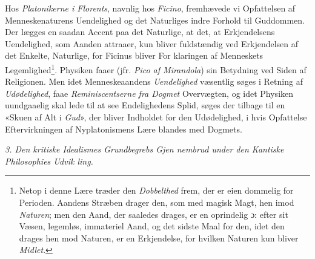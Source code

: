 Hos \emph{Platonikerne i Florents}, navnlig hos \emph{Ficino},
fremhævede vi Opfattelsen af Menneskenaturens Uendelighed
og det Naturliges indre Forhold til Guddommen. Der lægges
en saadan Accent paa det Naturlige, at det, at Erkjendelsens
Uendelighed, som Aanden attraaer, kun bliver fuldstændig ved
Erkjendelsen af det Enkelte, Naturlige, for Ficinus bliver For\-%
klaringen af Menneskets Legemlighed\footnote{Netop i denne Lære træder den \emph{Dobbelthed} frem, der er eien\-%
dommelig for Perioden. Aandens Stræben drager den, som med
magisk Magt, hen imod \emph{Naturen}; men den Aand, der saaledes
drages, er en oprindelig ɔ: efter sit Væsen, legemløs, immateriel
Aand, og det sidste Maal for den, idet den drages hen mod Naturen,
er en Erkjendelse, for hvilken Naturen kun bliver \emph{Midlet}.}. Physiken faaer (jfr.
\emph{Pico af Mirandola}) sin Betydning ved Siden af Religionen.
Men idet Menneskeaandens \emph{Uendelighed} væsentlig søges i
 Retning af \emph{Udødelighed}, faae \emph{Reminiscentserne fra
Dogmet} Overvægten, og idet Physiken uundgaaelig skal lede
til at see Endelighedens Splid, søges der tilbage til en «Skuen
af Alt i \emph{Gud}», der bliver Indholdet for den Udødelighed, i
hvis Opfattelse Eftervirkningen af Nyplatonismens Lære blandes
med Dogmets.

\divrule

\emph{3. Den kritiske Idealismes Grundbegrebs Gjen\-%
nembrud under den Kantiske Philosophies Udvik\-%
ling.}

